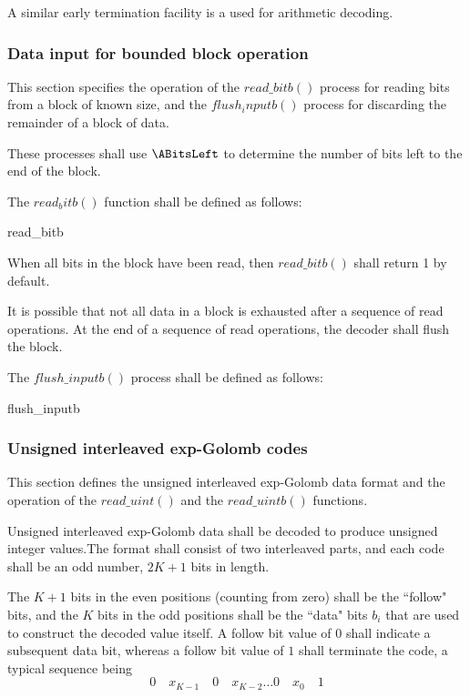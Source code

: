 \begin{informative}
A similar early termination facility is a used for arithmetic decoding.
\end{informative}

\subsubsection{Data input for bounded block operation}
\label{blockreadbit}

This section specifies the operation of the $read\_bitb()$ process for reading bits from
a block of known size, and the $flush_inputb()$ process for discarding the remainder of a block of 
data. 

These processes shall use $\ABitsLeft$ to determine the number of bits left to the 
end of the block.

The $read_bitb()$ function shall be defined as follows:

\begin{pseudo}{read\_bitb}{}
\bsELSE
\bsEND
\end{pseudo}

When all bits in the block have been read, then $read\_bitb()$ shall return 1 by default. 

It is possible that not all data in a block is exhausted after a sequence of read operations.
At the end of a sequence of read operations, the decoder shall flush the block. 

The $flush\_inputb()$ process shall be defined as follows:

\begin{pseudo}{flush\_inputb}{}
\bsEND
\end{pseudo}

\subsubsection{Unsigned interleaved exp-Golomb codes}
This section defines the unsigned interleaved exp-Golomb data format and the operation
of the $read\_uint()$ and the $read\_uintb()$ functions. 

Unsigned interleaved exp-Golomb data shall be decoded to produce unsigned
 integer values.The format shall consist of two interleaved parts, 
and each code shall be an odd number, $2K+1$ bits in length.

The $K+1$ bits in the even positions (counting from zero) shall be the ``follow" bits, and 
the $K$ bits in the odd positions shall be the ``data" bits $b_i$ that are used to construct
the decoded value itself. A follow bit value of $0$ shall indicate a subsequent data bit,
whereas a follow bit value of $1$ shall terminate the code, a typical sequence being
\begin{equation*}
0\quad x_{K-1}\quad 0\quad x_{K-2}\hdots 0\quad x_{0}\quad 1
\end{equation*}

